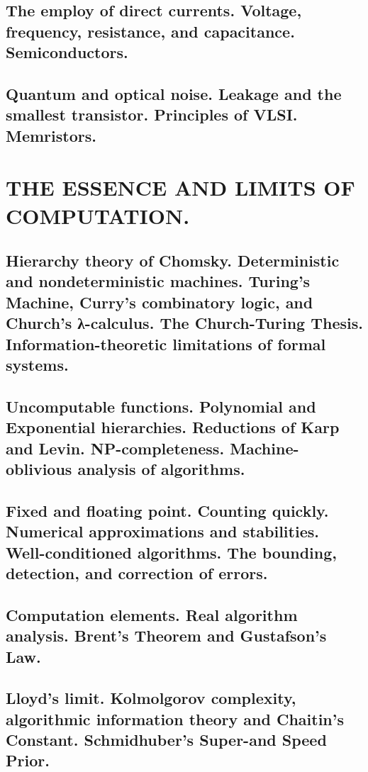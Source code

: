 \documentclass[letterpaper,draft]{memoir}
\begin{document}
\chapter{The employ of direct currents. Voltage, frequency, resistance, and capacitance. Semiconductors.}

\chapter{Quantum and optical noise. Leakage and the smallest transistor. Principles
of VLSI. Memristors.}

\part{THE ESSENCE AND LIMITS OF COMPUTATION.}

\chapter{Hierarchy theory of Chomsky. Deterministic and nondeterministic machines.
Turing's Machine, Curry's combinatory logic, and Church's \greektext λ\latintext-calculus. The
Church-Turing Thesis. Information-theoretic limitations of formal systems.}

\chapter{Uncomputable functions. Polynomial and Exponential hierarchies. Reductions
of Karp and Levin. NP-completeness. Machine-oblivious analysis of algorithms.}

\chapter{Fixed and floating point. Counting quickly. Numerical approximations and
stabilities. Well-conditioned algorithms. The bounding, detection, and
correction of errors.}

\chapter{Computation elements. Real algorithm analysis. Brent's Theorem and
Gustafson's Law.}

\chapter{Lloyd's limit. Kolmolgorov complexity, algorithmic information theory and
Chaitin's Constant. Schmidhuber's Super- \latintext and Speed Prior.}
\end{document}
